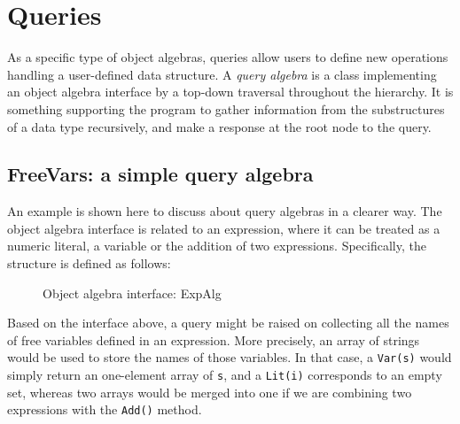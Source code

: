 \section{Queries}\label{sec:queries}

As a specific type of object algebras, queries allow users to define
new operations handling a user-defined data structure. A \textit{query
  algebra} is a class implementing an object algebra interface by a
top-down traversal throughout the hierarchy. It is something
supporting the program to gather information from the substructures of
a data type recursively, and make a response at the root node to the
query.

\subsection{FreeVars: a simple query algebra}\label{subsec:freevars}

An example is shown here to discuss about query algebras in a clearer
way. The object algebra interface is related to an expression, where
it can be treated as a numeric literal, a variable or the addition of
two expressions. Specifically, the structure is defined as follows:

\begin{figure}[!htbp]
\vspace{-.1in}
\caption{Object algebra interface: ExpAlg}
\label{exp_alg}
\end{figure}
\begin{comment}
\bruno{Don't copy the code! Use the code from the
  repository directly via the ruby script! The same applies to the
  other pieces of code in the rest of the paper.}
\end{comment}
  
Based on the interface above, a query might be raised on collecting
all the names of free variables defined in an expression. More
precisely, an array of strings would be used to store the names of
those variables. In that case, a \lstinline{Var(s)} would simply return an
one-element array of \lstinline{s}, and a \lstinline{Lit(i)} corresponds to an empty set,
whereas two arrays would be merged into one if we are combining two
expressions with the \lstinline{Add()} method.

